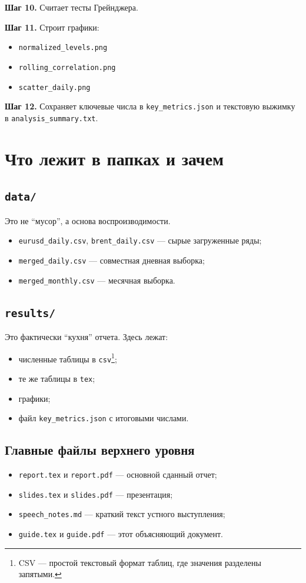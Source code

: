 \documentclass[a4paper,12pt]{article}
\begin{document}
\textbf{Шаг 10.} Считает тесты Грейнджера.

\textbf{Шаг 11.} Строит графики:
\begin{itemize}
    \item \texttt{normalized\_levels.png}
    \item \texttt{rolling\_correlation.png}
    \item \texttt{scatter\_daily.png}
\end{itemize}

\textbf{Шаг 12.} Сохраняет ключевые числа в \texttt{key\_metrics.json} и текстовую выжимку в \texttt{analysis\_summary.txt}.

\section{Что лежит в папках и зачем}

\subsection{\texttt{data/}}
Это не ``мусор'', а основа воспроизводимости.
\begin{itemize}
    \item \texttt{eurusd\_daily.csv}, \texttt{brent\_daily.csv} --- сырые загруженные ряды;
    \item \texttt{merged\_daily.csv} --- совместная дневная выборка;
    \item \texttt{merged\_monthly.csv} --- месячная выборка.
\end{itemize}

\subsection{\texttt{results/}}
Это фактически ``кухня'' отчета. Здесь лежат:
\begin{itemize}
    \item численные таблицы в \texttt{csv}\footnote{CSV --- простой текстовый формат таблиц, где значения разделены запятыми.};
    \item те же таблицы в \texttt{tex};
    \item графики;
    \item файл \texttt{key\_metrics.json} с итоговыми числами.
\end{itemize}

\subsection{Главные файлы верхнего уровня}
\begin{itemize}
    \item \texttt{report.tex} и \texttt{report.pdf} --- основной сданный отчет;
    \item \texttt{slides.tex} и \texttt{slides.pdf} --- презентация;
    \item \texttt{speech\_notes.md} --- краткий текст устного выступления;
    \item \texttt{guide.tex} и \texttt{guide.pdf} --- этот объясняющий документ.
\end{itemize}
\end{document}
